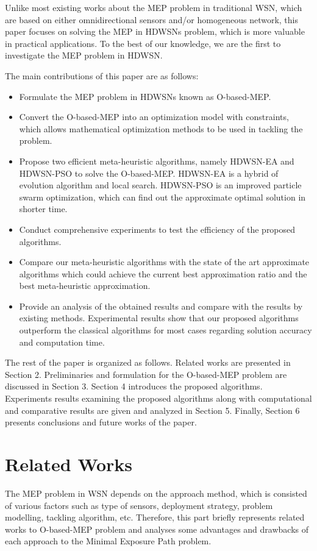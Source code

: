 \documentclass[final]{elsarticle}
\begin{document}
Unlike most existing works about the MEP problem in traditional WSN, which are based on either omnidirectional sensors and/or homogeneous network, this paper focuses on solving the MEP in HDWSNs problem, which is more valuable in practical applications. To the best of our knowledge, we are the first to investigate the MEP problem in HDWSN.

The main contributions of this paper are as follows:
\begin{itemize}
	\itemsep0em
	\item Formulate the MEP problem in HDWSNs known as O-based-MEP.
	\item Convert the O-based-MEP into an optimization model with constraints, which allows mathematical optimization methods to be used in tackling the problem. 
	\item Propose two efficient meta-heuristic algorithms, namely HDWSN-EA and HDWSN-PSO to solve the O-based-MEP. HDWSN-EA is a hybrid of evolution algorithm and local search. HDWSN-PSO is an improved particle swarm optimization, which can find out the approximate optimal solution in shorter time.
	\item Conduct comprehensive experiments to test the efficiency of the proposed algorithms.
	\item Compare our meta-heuristic algorithms with the state of the art approximate algorithms which could achieve the current best approximation ratio and the best meta-heuristic approximation.
	\item Provide an analysis of the obtained results and compare with the results by existing methods. Experimental results show that our proposed algorithms outperform the classical algorithms for most cases regarding solution accuracy and computation time.	
\end{itemize}

The rest of the paper is organized as follows. Related works are presented in Section 2. Preliminaries and formulation for the O-based-MEP problem are discussed in Section 3. Section 4 introduces the proposed algorithms. Experiments results examining the proposed algorithms along with computational and comparative results are given and analyzed in Section 5. Finally, Section 6 presents conclusions and future works of the paper.

\section{Related Works}
The MEP problem in WSN depends on the approach method, which is consisted of various factors such as type of sensors, deployment strategy, problem modelling, tackling algorithm, etc. Therefore, this part briefly represents related works to O-based-MEP problem and analyses some advantages and drawbacks of each approach to the Minimal Exposure Path problem.
\end{document}
